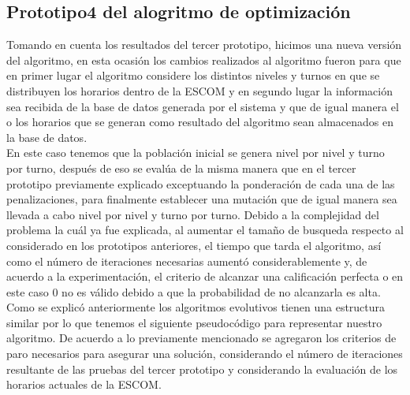 \subsection{Prototipo4 del alogritmo de optimización}

Tomando en cuenta los resultados del tercer prototipo, hicimos una nueva versión del algoritmo, en esta ocasión los cambios realizados al algoritmo fueron para que en primer lugar el algoritmo considere los distintos niveles y turnos en que se distribuyen los horarios dentro de la ESCOM y en segundo lugar la información sea recibida de la base de datos generada por el sistema y que de igual manera el o los horarios que se generan como resultado del algoritmo sean almacenados en la base de datos.\\

En este caso tenemos que la población inicial se genera nivel por nivel y turno por turno, después de eso se evalúa de la misma manera que en el tercer prototipo previamente explicado exceptuando la ponderación de cada una de las penalizaciones, para finalmente establecer una mutación que de igual manera sea llevada a cabo nivel por nivel y turno por turno. Debido a la complejidad del problema la cuál ya fue explicada, al aumentar el tamaño de busqueda respecto al considerado en los prototipos anteriores, el tiempo que tarda el algoritmo, así como el número de iteraciones necesarias aumentó considerablemente y, de acuerdo a la experimentación, el criterio de alcanzar una calificación perfecta o en este caso 0 no es válido debido a que la probabilidad de no alcanzarla es alta.\\

Como se explicó anteriormente los algoritmos evolutivos tienen una estructura similar por lo que tenemos el siguiente pseudocódigo para representar nuestro algoritmo. De acuerdo a lo previamente mencionado se agregaron los criterios de paro necesarios para asegurar una solución, considerando el número de iteraciones resultante de las pruebas del tercer prototipo y considerando la evaluación de los horarios actuales de la ESCOM.\\

